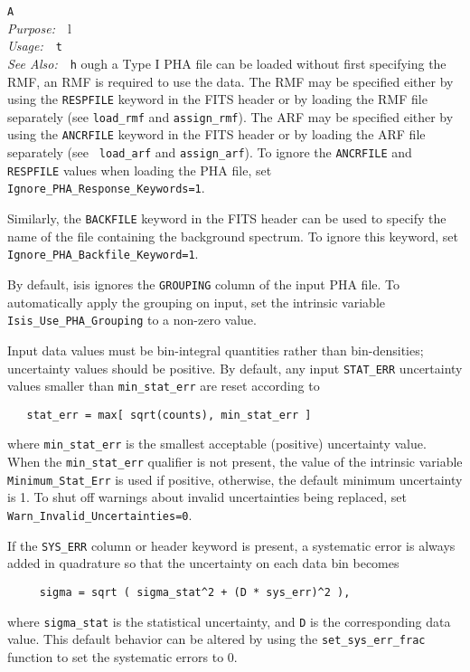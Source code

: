 \documentclass{book}
\makeatletter
\newif\ifpdf
\newenvironment{isisfunction}[4]%
{\index{{#1}@{\tt #1}}%
  \ifpdf
  \else
     \addcontentsline{toc}{subsection}{{#1} -- {#2}}
  \fi
  \vbox{
          \vspace*{\baselineskip}
          {\LARGE\tt #1}\vspace*{\baselineskip}\\
          {{\it Purpose:}~~{#2}}\\
          {{\it Usage:}~~{\tt #3}}\\
          {{\it See Also:}~~{\tt #4}}
       }
}%
{ }
\makeatother
\begin{document}
\begin{isisfunction}
Although a Type I PHA file can be loaded without first
specifying the RMF, an RMF is required to use the data.  The
RMF may be specified either by using the {\tt RESPFILE} keyword
in the FITS header or by loading the RMF file separately (see
{\tt load\_rmf} and {\tt assign\_rmf}). The ARF may be
specified either by using the {\tt ANCRFILE} keyword in the
FITS header or by loading the ARF file separately (see {\tt
load\_arf} and {\tt assign\_arf}).  To ignore the
\verb|ANCRFILE| and \verb|RESPFILE| values when loading
the PHA file, set \verb|Ignore_PHA_Response_Keywords=1|.


Similarly, the {\tt BACKFILE} keyword in the FITS header
can be used to specify the name of the file containing
the background spectrum.  To ignore this keyword,
set \verb|Ignore_PHA_Backfile_Keyword=1|.


By default, isis ignores the \verb|GROUPING| column of the
input PHA file.  To automatically apply the grouping on input,
set the intrinsic variable \verb|Isis_Use_PHA_Grouping| to a
non-zero value.

Input data values must be bin-integral quantities rather than
bin-densities; uncertainty values should be positive.  By
default, any input {\tt STAT\_ERR} uncertainty values smaller
than \verb|min_stat_err| are reset according to
\begin{verbatim}
   stat_err = max[ sqrt(counts), min_stat_err ]
\end{verbatim}
where \verb|min_stat_err| is the smallest acceptable (positive)
uncertainty value. When the \verb|min_stat_err| qualifier is
not present, the value of the intrinsic variable
\verb|Minimum_Stat_Err| is used if positive, otherwise, the
default minimum uncertainty is 1.  To shut off warnings about
invalid uncertainties being replaced, set
\verb|Warn_Invalid_Uncertainties=0|.


If the \verb|SYS_ERR| column or header keyword is present, a
systematic error is always added in quadrature so that the
uncertainty on each data bin becomes
\begin{verbatim}
     sigma = sqrt ( sigma_stat^2 + (D * sys_err)^2 ),
\end{verbatim}
where \verb|sigma_stat| is the statistical uncertainty, and
\verb|D| is the corresponding data value.  This default
behavior can be altered by using the \verb|set_sys_err_frac|
function to set the systematic errors to 0.


\end{isisfunction}
\end{document}
